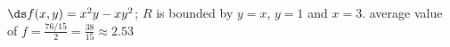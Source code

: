 {$\ds f(x,y) =x^2y-xy^2$; \quad $R$ is bounded by $y=x$, $y=1$ and $x=3$.
}
{average value of $f= \frac{76/15}{2} = \frac{38}{15} \approx 2.53$
}